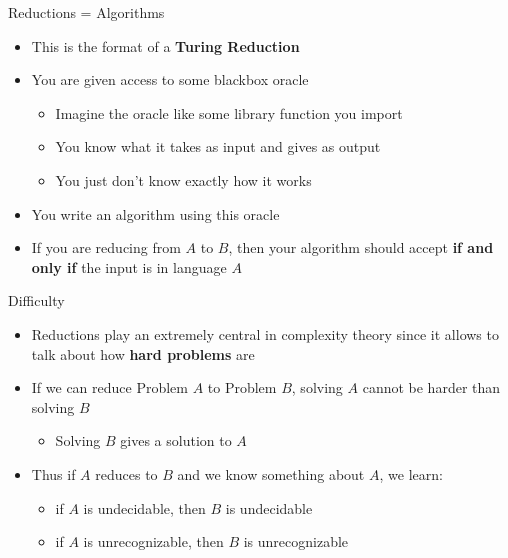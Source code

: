\documentclass[aspectratio=169]{beamer}
\begin{document}
\begin{frame}{Reductions = Algorithms}
    \begin{itemize}
        \item This is the format of a \textbf{Turing Reduction}\footnotemark\  \pause
        \item You are given access to some blackbox oracle \pause
        \begin{itemize}
            \item Imagine the oracle like some library function you import \pause
            \item You know what it takes as input and gives as output \pause
            \item You just don't know exactly how it works \pause
        \end{itemize}
        \item You write an algorithm using this oracle \pause
        \item If you are reducing from $A$ to $B$, then your algorithm should accept \textbf{if and only if} the input is in language $A$
    \end{itemize}
\end{frame}

\begin{frame}{Difficulty}
    \begin{itemize}
        \item Reductions play an extremely central in complexity theory since it allows to talk about how \textbf{hard problems} are \pause
        \item If we can reduce Problem $A$ to Problem $B$, solving $A$ cannot be harder than solving $B$  
        \begin{itemize}
            \item Solving $B$ gives a solution to $A$ \pause
        \end{itemize}
        \item Thus if $A$ reduces to $B$ and we know something about $A$, we learn: \pause
        \begin{itemize}
            \item if $A$ is undecidable, then $B$ is undecidable \pause
            \item if $A$ is unrecognizable, then $B$ is unrecognizable 
        \end{itemize}
    \end{itemize}
\end{frame}
\end{document}
